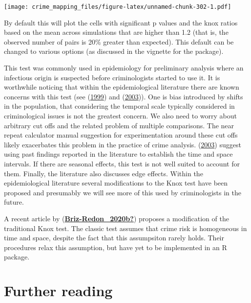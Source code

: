 \documentclass[
  krantz2]{krantz}
\begin{document}
\texttt{[image: crime\_mapping\_files/figure-latex/unnamed-chunk-302-1.pdf]}

By default this will plot the cells with significant p values and the knox ratios based on the mean across simulations that are higher than 1.2 (that is, the observed number of pairs is 20\% greater than expected). This default can be changed to various options (as discussed in the vignette for the package).

This test was commonly used in epidemiology for preliminary analysis where an infectious origin is suspected before criminologists started to use it. It is worthwhile noticing that within the epidemiological literature there are known concerns with this test (see (\protect\hyperlink{ref-Kulldorff_1999}{1999}) and (\protect\hyperlink{ref-Townsley_2003}{2003})). One is bias introduced by shifts in the population, that considering the temporal scale typically considered in criminological issues is not the greatest concern. We also need to worry about arbitrary cut offs and the related problem of multiple comparisons. The near repeat calculator manual suggestion for experimentation around these cut offs likely exacerbates this problem in the practice of crime analysis. (\protect\hyperlink{ref-Townsley_2003}{2003}) suggest using past findings reported in the literature to establish the time and space intervals. If there are seasonal effects, this test is not well suited to account for them. Finally, the literature also discusses edge effects. Within the epidemiological literature several modifications to the Knox test have been proposed and presumably we will see more of this used by criminologists in the future.

A recent article by (\protect\hyperlink{ref-Briz-Redon_2020b}{\textbf{Briz-Redon\_2020b?}}) proposes a modification of the traditional Knox test. The classic test assumes that crime risk is homogeneous in time and space, despite the fact that this assumpsiton rarely holds. Their procedures relax this assumption, but have yet to be implemented in an R package.

\hypertarget{further-reading-2}{%
\section{Further reading}\label{further-reading-2}}
\end{document}
